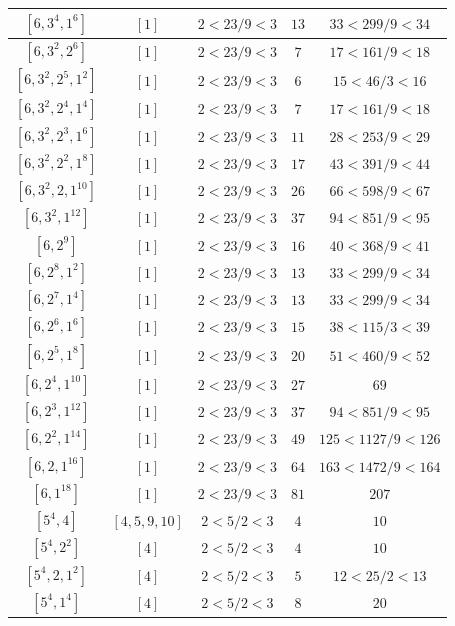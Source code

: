\documentclass{article}%
\begin{document}
\begin{center}
\begin{longtable}{||c|c|c|c|c||}
$[6, 3^{4}, 1^{6}]$ & $[1]$ & $2 < 23/9 < 3$ & $13$ & $33 < 299/9 < 34$ \\ \hline 
$[6, 3^{2}, 2^{6}]$ & $[1]$ & $2 < 23/9 < 3$ & $7$ & $17 < 161/9 < 18$ \\ \hline 
$[6, 3^{2}, 2^{5}, 1^{2}]$ & $[1]$ & $2 < 23/9 < 3$ & $6$ & $15 < 46/3 < 16$ \\ \hline 
$[6, 3^{2}, 2^{4}, 1^{4}]$ & $[1]$ & $2 < 23/9 < 3$ & $7$ & $17 < 161/9 < 18$ \\ \hline 
$[6, 3^{2}, 2^{3}, 1^{6}]$ & $[1]$ & $2 < 23/9 < 3$ & $11$ & $28 < 253/9 < 29$ \\ \hline 
$[6, 3^{2}, 2^{2}, 1^{8}]$ & $[1]$ & $2 < 23/9 < 3$ & $17$ & $43 < 391/9 < 44$ \\ \hline 
$[6, 3^{2}, 2, 1^{10}]$ & $[1]$ & $2 < 23/9 < 3$ & $26$ & $66 < 598/9 < 67$ \\ \hline 
$[6, 3^{2}, 1^{12}]$ & $[1]$ & $2 < 23/9 < 3$ & $37$ & $94 < 851/9 < 95$ \\ \hline 
$[6, 2^{9}]$ & $[1]$ & $2 < 23/9 < 3$ & $16$ & $40 < 368/9 < 41$ \\ \hline 
$[6, 2^{8}, 1^{2}]$ & $[1]$ & $2 < 23/9 < 3$ & $13$ & $33 < 299/9 < 34$ \\ \hline 
$[6, 2^{7}, 1^{4}]$ & $[1]$ & $2 < 23/9 < 3$ & $13$ & $33 < 299/9 < 34$ \\ \hline 
$[6, 2^{6}, 1^{6}]$ & $[1]$ & $2 < 23/9 < 3$ & $15$ & $38 < 115/3 < 39$ \\ \hline 
$[6, 2^{5}, 1^{8}]$ & $[1]$ & $2 < 23/9 < 3$ & $20$ & $51 < 460/9 < 52$ \\ \hline 
$[6, 2^{4}, 1^{10}]$ & $[1]$ & $2 < 23/9 < 3$ & $27$ & $69$ \\ \hline 
$[6, 2^{3}, 1^{12}]$ & $[1]$ & $2 < 23/9 < 3$ & $37$ & $94 < 851/9 < 95$ \\ \hline 
$[6, 2^{2}, 1^{14}]$ & $[1]$ & $2 < 23/9 < 3$ & $49$ & $125 < 1127/9 < 126$ \\ \hline 
$[6, 2, 1^{16}]$ & $[1]$ & $2 < 23/9 < 3$ & $64$ & $163 < 1472/9 < 164$ \\ \hline 
$[6, 1^{18}]$ & $[1]$ & $2 < 23/9 < 3$ & $81$ & $207$ \\ \hline 
$[5^{4}, 4]$ & $[4, 5, 9, 10]$ & $2 < 5/2 < 3$ & $4$ & $10$ \\ \hline 
$[5^{4}, 2^{2}]$ & $[4]$ & $2 < 5/2 < 3$ & $4$ & $10$ \\ \hline 
$[5^{4}, 2, 1^{2}]$ & $[4]$ & $2 < 5/2 < 3$ & $5$ & $12 < 25/2 < 13$ \\ \hline 
$[5^{4}, 1^{4}]$ & $[4]$ & $2 < 5/2 < 3$ & $8$ & $20$ \\ \hline 

\end{longtable}
\end{center}
\end{document}

